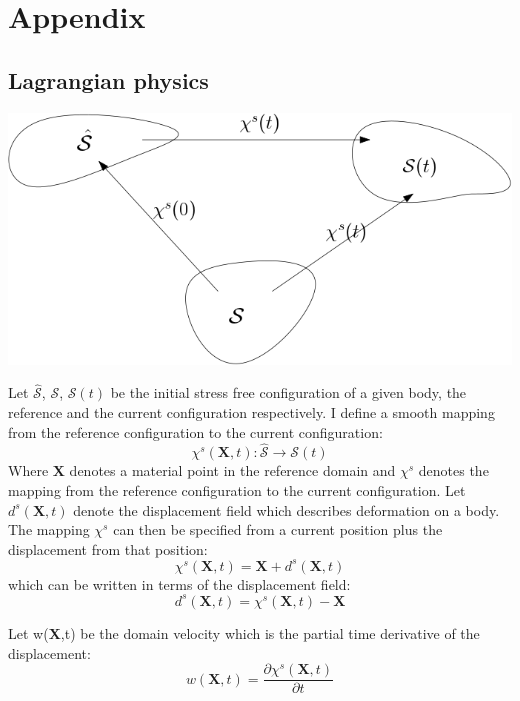 \chapter{Appendix}
\section{Lagrangian physics}

\begin{center}
\includegraphics[scale=0.4]{continuum_mapping.png}
\end{center}
Let $ \hat{\mathcal{S}}$, $\mathcal{S}$, $\mathcal{S}(t)$ be the initial stress free configuration of a given body, the reference and the current configuration respectively.
I define a smooth mapping from the reference configuration to the current configuration:
\begin{equation}
\chi^s(\textbf{X},t) : \hat{\mathcal{S}} \rightarrow \mathcal{S}(t)     
\end{equation}
Where $\textbf{X}$ denotes a material point in the reference domain and $\chi^s$ denotes the mapping from the reference configuration to the current configuration. Let $d^s(\textbf{X},t)$ denote the displacement field which describes deformation on a body. The mapping $\chi^s$ can then be specified from a current position plus the displacement from that position:
\begin{equation} \label{eq:chi}
 \chi^s(\textbf{X},t) = \textbf{X}  + d^s(\textbf{X} ,t) 
\end{equation}
which can be written in terms of the displacement field:
\begin{equation}
 d^s(\textbf{X},t) = \chi^s(\textbf{X},t) -\textbf{X}   
\end{equation}

Let w(\textbf{X},t) be the domain velocity which is the partial time derivative of the displacement: 
\begin{equation}
 w(\textbf{X},t) = \frac{\partial \chi^s(\textbf{X},t)}{\partial t}   
\end{equation}


